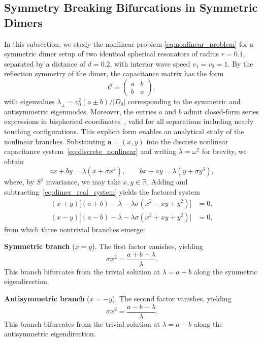 \documentclass[a4paper,reqno,twoside]{amsart}
\numberwithin{equation}{section}
\theoremstyle{definition}
\newcommand{\<}{\ensuremath \leq}
\renewcommand{\>}{\ensuremath \geq}
\begin{document}
\subsection{Symmetry Breaking Bifurcations in Symmetric Dimers}
In this subsection, we study the nonlinear problem \eqref{eq:nonlinear_problem} for a symmetric dimer setup of two identical spherical resonators of radius $r=0.1$, separated by a distance of $d=0.2$, with interior wave speed $v_1=v_2 = 1$. By the reflection symmetry of the dimer, 
the capacitance matrix has the form
\begin{equation}\label{eq:dimer_capacitance}
    \mathcal{C} = \begin{pmatrix}a & b \\ b & a \end{pmatrix},
\end{equation}
with eigenvalues $\lambda_\pm = v_0^2(a \pm b)/\lvert D_0\rvert$  corresponding to the symmetric and antisymmetric 
eigenmodes. Moreover, the entries $a$ and 
$b$ admit closed-form series expressions in bispherical 
coordinates~\cite{lekner2012electrostatics}, valid for all separations 
including nearly touching configurations. This explicit form enables an 
analytical study of the nonlinear branches. 
Substituting $\mathbf{a} = (x, y)$ into the discrete nonlinear 
capacitance system~\eqref{eq:discrete_nonlinear} and writing $\lambda = 
\omega^2$ for brevity, we obtain
\begin{equation}\label{eq:dimer_real_system}
    a x + b y = \lambda(x + \sigma x^3), \qquad 
    b x + a y = \lambda(y + \sigma y^3),
\end{equation}
where, by $S^1$ invariance, we may take $x, y \in \mathbb{R}$. Adding 
and subtracting~\eqref{eq:dimer_real_system} yields the factored system
\begin{align}
    (x+y)\bigl[(a+b) - \lambda - \lambda\sigma(x^2 - xy + y^2)\bigr] &= 0, \\
    (x-y)\bigl[(a-b) - \lambda - \lambda\sigma(x^2 + xy + y^2)\bigr] &= 0,
\end{align}
from which three nontrivial branches emerge:

\textbf{Symmetric branch} ($x = y$). The first factor vanishes, yielding
\[
    \sigma x^2 = \frac{a + b - \lambda}{\lambda}.
\]
This branch bifurcates from the trivial solution at $\lambda = a + b$ 
along the symmetric eigendirection.

\textbf{Antisymmetric branch} ($x = -y$). The second factor vanishes, 
yielding
\[
    \sigma x^2 = \frac{a - b - \lambda}{\lambda}.
\]
This branch bifurcates from the trivial solution at $\lambda = a - b$ 
along the antisymmetric eigendirection.
\end{document}
